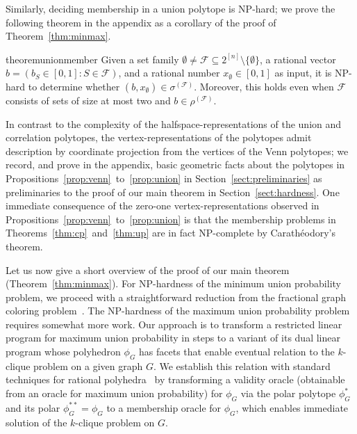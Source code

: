 \documentclass[11pt]{article}
\newcommand{\up}{\ensuremath{\sigma}}
\newcommand{\cp}{\ensuremath{\rho}}
\begin{document}
Similarly, deciding membership in a union polytope is NP-hard; we prove the
following theorem in the appendix as a corollary of the proof of 
Theorem~\ref{thm:minmax}. 

\begin{restatable}{theorem}{unionmember}
\label{thm:up}
Given a set family 
$\emptyset\neq\mathcal{F}\subseteq 2^{[n]}\setminus\{\emptyset\}$, 
a rational vector $b=(b_S\in[0,1]:S\in\mathcal{F})$, and a rational
number $x_\emptyset\in[0,1]$ as input, it is NP-hard to 
determine whether $(b,x_\emptyset)\in\up^{(\mathcal{F})}$.
Moreover, this holds even when $\mathcal{F}$ consists of sets of size 
at most two and $b\in\cp^{(\mathcal{F})}$.
\end{restatable}

In contrast to the complexity of the halfspace-representations of the 
union and correlation polytopes, the vertex-representations of the polytopes
admit description by coordinate projection from the vertices of the Venn 
polytopes; we record, and prove in the appendix, basic geometric 
facts about the polytopes in 
Propositions~\ref{prop:venn}~to~\ref{prop:union} in 
Section~\ref{sect:preliminaries} as preliminaries to the
proof of our main theorem in Section~\ref{sect:hardness}. 
One immediate consequence of the zero-one vertex-representations observed in 
Propositions~\ref{prop:venn}~to~\ref{prop:union} 
is that the membership problems in Theorems~\ref{thm:cp}~and~\ref{thm:up}
are in fact NP-complete by Carath\'eodory's theorem.

Let us now give a short overview of the proof of our main theorem
(Theorem~\ref{thm:minmax}). For NP-hardness of the minimum union probability
problem, we proceed with a straightforward reduction from the fractional graph
coloring problem~\cite{GrotschelLS1981,LundY1994,ScheinermanU1997}. 
The NP-hardness
of the maximum union probability problem requires somewhat more work. 
Our approach is to transform a restricted linear program for maximum
union probability in steps to a variant of its dual linear program whose 
polyhedron $\phi_G$ has facets that enable eventual relation to 
the $k$-clique problem on a given graph $G$. We establish this relation 
with standard techniques for rational polyhedra~\cite{GrotschelLS1993} by 
transforming a validity oracle (obtainable from an oracle for maximum 
union probability) for $\phi_G$ via the polar polytope $\phi_G^*$ and its polar 
$\phi_G^{**}=\phi_G$ to a membership oracle for $\phi_G$, which enables
immediate solution of the $k$-clique problem on $G$.
\end{document}
